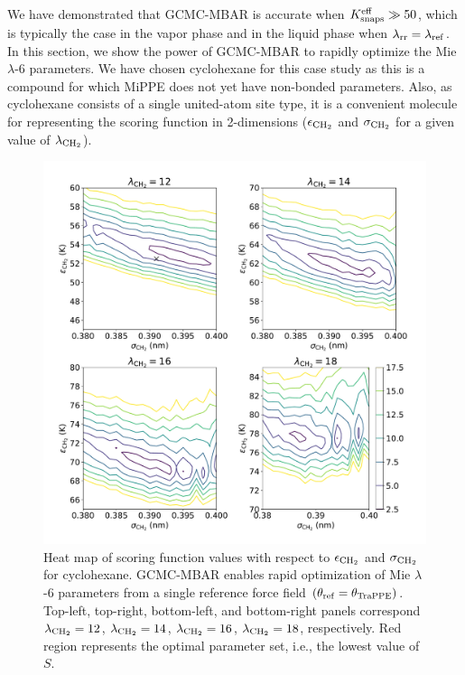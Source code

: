 \documentclass[journal=jced,manuscript=article]{achemso}
\begin{document}
We have demonstrated that GCMC-MBAR is accurate when $K_{\rm snaps}^{\rm eff} \gg 50$, which is typically the case in the vapor phase and in the liquid phase when $\lambda_{\rm rr} = \lambda_{\rm ref}$. In this section, we show the power of GCMC-MBAR to rapidly optimize the Mie $\lambda$-6 parameters. We have chosen cyclohexane for this case study as this is a compound for which MiPPE does not yet have non-bonded parameters. Also, as cyclohexane consists of a single united-atom site type, it is a convenient molecule for representing the scoring function in 2-dimensions ($\epsilon_{\rm CH_2}$ and $\sigma_{\rm CH_2}$ for a given value of $\lambda_{\rm CH_2}$).

	\begin{figure}[htb!]
		\centering
		\includegraphics[width=6.4in]{CYC6_scoring_function_lam.pdf}
		\caption{Heat map of scoring function values with respect to $\epsilon_{\rm CH_2}$ and $\sigma_{\rm CH_2}$ for cyclohexane. GCMC-MBAR enables rapid optimization of Mie $\lambda$-6 parameters from a single reference force field $(\theta_{\rm ref} = \theta_{\rm TraPPE})$. Top-left, top-right, bottom-left, and bottom-right panels correspond $\lambda_{\rm CH_2} = 12$, $\lambda_{\rm CH_2} = 14$, $\lambda_{\rm CH_2} = 16$, $\lambda_{\rm CH_2} = 18$, respectively. Red region represents the optimal parameter set, i.e., the lowest value of $S$.}
		\label{fig:Score_CYC6}
	\end{figure} 
\end{document}
